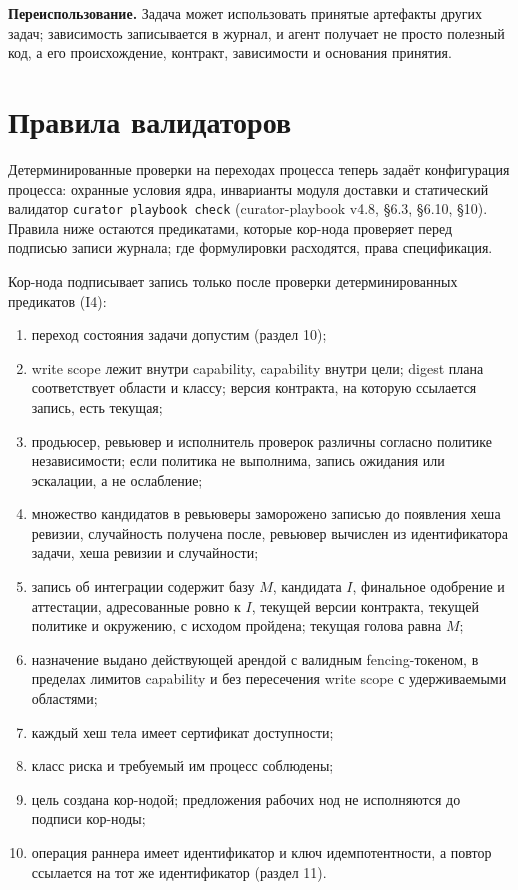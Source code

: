\documentclass[11pt,a4paper]{article}
\begin{document}
\textbf{Переиспользование.} Задача может использовать принятые артефакты других задач; зависимость записывается в журнал, и агент получает не просто полезный код, а его происхождение, контракт, зависимости и основания принятия.

\section{Правила валидаторов}

Детерминированные проверки на переходах процесса теперь задаёт конфигурация процесса: охранные условия ядра, инварианты модуля доставки и статический валидатор \texttt{curator playbook check} (curator-playbook v4.8, §6.3, §6.10, §10). Правила ниже остаются предикатами, которые кор-нода проверяет перед подписью записи журнала; где формулировки расходятся, права спецификация.

Кор-нода подписывает запись только после проверки детерминированных предикатов (I4):
\begin{enumerate}
\item переход состояния задачи допустим (раздел 10);
\item write scope лежит внутри capability, capability внутри цели; digest плана соответствует области и классу; версия контракта, на которую ссылается запись, есть текущая;
\item продьюсер, ревьювер и исполнитель проверок различны согласно политике независимости; если политика не выполнима, запись ожидания или эскалации, а не ослабление;
\item множество кандидатов в ревьюверы заморожено записью до появления хеша ревизии, случайность получена после, ревьювер вычислен из идентификатора задачи, хеша ревизии и случайности;
\item запись об интеграции содержит базу $M$, кандидата $I$, финальное одобрение и аттестации, адресованные ровно к $I$, текущей версии контракта, текущей политике и окружению, с исходом пройдена; текущая голова равна $M$;
\item назначение выдано действующей арендой с валидным fencing-токеном, в пределах лимитов capability и без пересечения write scope с удерживаемыми областями;
\item каждый хеш тела имеет сертификат доступности;
\item класс риска и требуемый им процесс соблюдены;
\item цель создана кор-нодой; предложения рабочих нод не исполняются до подписи кор-ноды;
\item операция раннера имеет идентификатор и ключ идемпотентности, а повтор ссылается на тот же идентификатор (раздел 11).
\end{enumerate}
\end{document}
